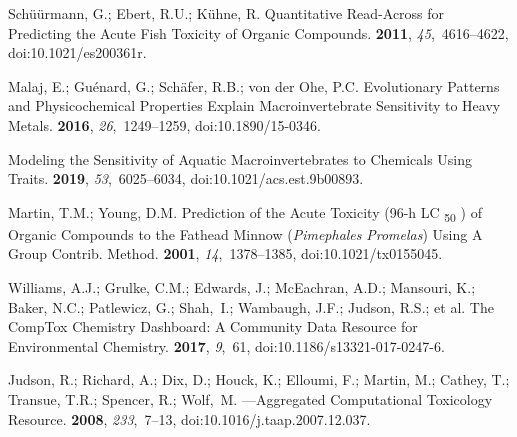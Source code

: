 \documentclass[data,datadescriptor,accept,moreauthors,pdftex]{Definitions/mdpi}
\begin{document}
\begin{thebibliography}{999}
Sch{\"u}{\"u}rmann, G.; Ebert, R.U.; K{\"u}hne, R.
\newblock Quantitative {{Read}}-{{Across}} for {{Predicting}} the {{Acute Fish
  Toxicity}} of {{Organic Compounds}}.
 {\bf 2011}, {\em
  45},~4616--4622, doi:10.1021/es200361r.

Malaj, E.; Gu{\'e}nard, G.; Sch{\"a}fer, R.B.; {von der Ohe}, P.C.
\newblock Evolutionary Patterns and Physicochemical Properties Explain
  Macroinvertebrate Sensitivity to Heavy Metals.
 {\bf 2016}, {\em 26},~1249--1259, doi:10.1890/15-0346.

\newblock Modeling the {{Sensitivity}} of {{Aquatic Macroinvertebrates}} to
  {{Chemicals Using Traits}}.
 {\bf 2019}, {\em
  53},~6025--6034, doi:10.1021/acs.est.9b00893.

Martin, T.M.; Young, D.M.
\newblock Prediction of the {{Acute Toxicity}} (96-h {{LC}}
  {\textsubscript{50}} ) of {{Organic Compounds}} to the {{Fathead Minnow}} ({{{\emph{Pimephales}}}}{\emph{ Promelas}}) {{Using}} A {{Group Contrib. Method}}. {\bf 2001}, {\em
  14},~1378--1385, doi:10.1021/tx0155045.

Williams, A.J.; Grulke, C.M.; Edwards, J.; McEachran, A.D.; Mansouri, K.;
  Baker, N.C.; Patlewicz, G.; Shah,~I.; Wambaugh, J.F.; Judson, R.S.; et al.
\newblock The {{CompTox Chemistry Dashboard}}: A Community Data Resource for
  Environmental Chemistry.
 {\bf 2017}, {\em 9},~61, doi:10.1186/s13321-017-0247-6.

Judson, R.; Richard, A.; Dix, D.; Houck, K.; Elloumi, F.; Martin, M.; Cathey,
  T.; Transue, T.R.; Spencer, R.; Wolf,~M.
---{{Aggregated Computational Toxicology
  Resource}}.
 {\bf 2008}, {\em
  233},~7--13, doi:10.1016/j.taap.2007.12.037.


\end{thebibliography}
\end{document}
